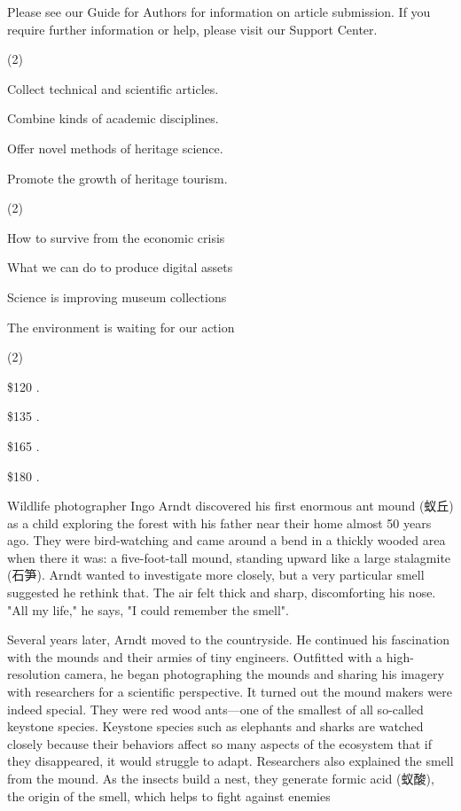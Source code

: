 \documentclass{英语试卷}
\begin{document}
\vspace{0.4em}
\par Please see our Guide for Authors for information on article submission. If you require further information or help, please visit our Support Center.\par
{}
\begin{choices}(2)
  \item Collect technical and scientific articles.
  \item Combine kinds of academic disciplines.
  \item Offer novel methods of heritage science.
  \item Promote the growth of heritage tourism.
\end{choices}
\begin{choices}(2)
  \item How to survive from the economic crisis
  \item What we can do to produce digital assets
  \item Science is improving museum collections
  \item The environment is waiting for our action
\end{choices}
\begin{choices}(2)
  \item \$120 .
  \item \$135 .
  \item \$165 .
  \item \$180 .
\end{choices}
\par Wildlife photographer Ingo Arndt discovered his first enormous ant mound (蚁丘) as a child exploring the forest with his father near their home almost 50 years ago. They were bird-watching and came around a bend in a thickly wooded area when there it was: a five-foot-tall mound, standing upward like a large stalagmite (石笋). Arndt wanted to investigate more closely, but a very particular smell suggested he rethink that. The air felt thick and sharp, discomforting his nose. "All my life," he says, "I could remember the smell".\par
\par Several years later, Arndt moved to the countryside. He continued his fascination with the mounds and their armies of tiny engineers. Outfitted with a high-resolution camera, he began photographing the mounds and sharing his imagery with researchers for a scientific perspective. It turned out the mound makers were indeed special. They were red wood ants—one of the smallest of all so-called keystone species. Keystone species such as elephants and sharks are watched closely because their behaviors affect so many aspects of the ecosystem that if they disappeared, it would struggle to adapt. Researchers also explained the smell from the mound. As the insects build a nest, they generate formic acid (蚁酸), the origin of the smell, which helps to fight against enemies\par
\end{document}
